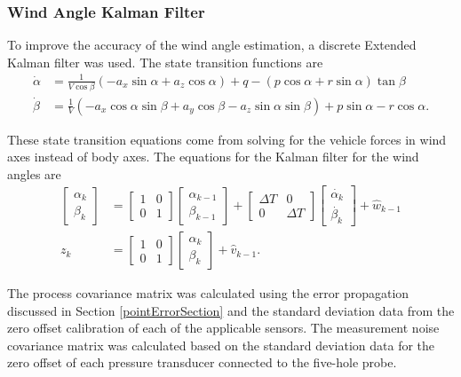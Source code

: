 \subsubsection*{Wind Angle Kalman Filter}

To improve the accuracy of the wind angle estimation, a discrete Extended Kalman filter was used. The state transition functions are
\begin{align}
\dot{\alpha} & = \frac{1}{V\cos\beta}(-a_x\sin\alpha+a_z\cos\alpha)+q-(p\cos\alpha+r\sin\alpha)\tan\beta\\
\dot{\beta} &=\frac{1}{V}(-a_x\cos\alpha\sin\beta+a_y\cos\beta-a_z\sin\alpha\sin\beta)+p\sin\alpha-r\cos\alpha.
\end{align}

These state transition equations come from solving for the vehicle forces in wind axes instead of body axes\cite{klein2006aircraft}. The equations for the Kalman filter for the wind angles are
\begin{align}
\begin{bmatrix}
\alpha_k\\\beta_k
\end{bmatrix} &= \begin{bmatrix}
1& 0\\0&1
\end{bmatrix}\begin{bmatrix}
\alpha_{k-1}\\\beta_{k-1}
\end{bmatrix}+\begin{bmatrix}
\Delta T& 0\\0&\Delta T
\end{bmatrix}\begin{bmatrix}
\dot{\alpha_{k}}\\\dot{\beta_{k}}
\end{bmatrix}+\hat{w}_{k-1}\\
z_k & = \begin{bmatrix}
1 & 0\\0&1
\end{bmatrix}\begin{bmatrix}
\alpha_{k}\\
\beta_{k}
\end{bmatrix}+\hat{v}_{k-1}.
\end{align}

The process covariance matrix was calculated using the error propagation discussed in Section \ref{pointErrorSection} and the standard deviation data from the zero offset calibration of each of the applicable sensors. The measurement noise covariance matrix was calculated based on the standard deviation data for the zero offset of each pressure transducer connected to the five-hole probe.

